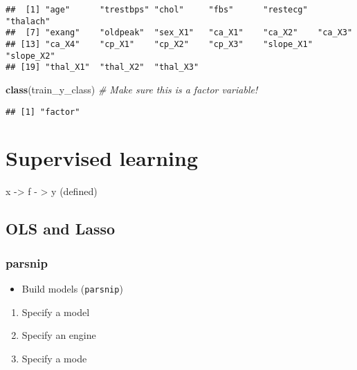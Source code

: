 \documentclass[
]{book}
\newenvironment{Shaded}{\begin{snugshade}}{\end{snugshade}}
\newcommand{\CommentTok}[1]{\textcolor[rgb]{0.56,0.35,0.01}{\textit{#1}}}
\newcommand{\KeywordTok}[1]{\textcolor[rgb]{0.13,0.29,0.53}{\textbf{#1}}}
\newcommand{\NormalTok}[1]{#1}
\providecommand{\tightlist}{%
  \setlength{\itemsep}{0pt}\setlength{\parskip}{0pt}}
\begin{document}
\begin{verbatim}
##  [1] "age"      "trestbps" "chol"     "fbs"      "restecg"  "thalach" 
##  [7] "exang"    "oldpeak"  "sex_X1"   "ca_X1"    "ca_X2"    "ca_X3"   
## [13] "ca_X4"    "cp_X1"    "cp_X2"    "cp_X3"    "slope_X1" "slope_X2"
## [19] "thal_X1"  "thal_X2"  "thal_X3"
\end{verbatim}

\begin{Shaded}
\begin{Highlighting}[]
\KeywordTok{class}\NormalTok{(train\_y\_class) }\CommentTok{\# Make sure this is a factor variable!}
\end{Highlighting}
\end{Shaded}

\begin{verbatim}
## [1] "factor"
\end{verbatim}

\hypertarget{supervised-learning}{%
\section{Supervised learning}\label{supervised-learning}}

x -\textgreater{} f - \textgreater{} y (defined)

\hypertarget{ols-and-lasso}{%
\subsection{OLS and Lasso}\label{ols-and-lasso}}

\hypertarget{parsnip}{%
\subsubsection{parsnip}\label{parsnip}}

\begin{itemize}
\tightlist
\item
  Build models (\texttt{parsnip})
\end{itemize}

\begin{enumerate}
\def\labelenumi{\arabic{enumi}.}
\tightlist
\item
  Specify a model
\item
  Specify an engine
\item
  Specify a mode
\end{enumerate}
\end{document}
